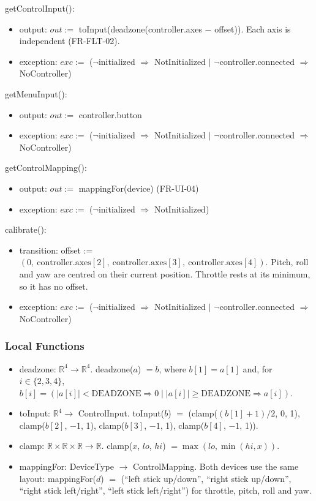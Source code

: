 \documentclass[12pt, titlepage]{article}
\newcommand{\noinit}{$\neg$initialized $\Rightarrow$ NotInitialized}
\begin{document}
\noindent getControlInput():
\begin{itemize}
\item output: $out :=$ toInput(deadzone(controller.axes $-$ offset)). Each
  axis is independent (FR-FLT-02).
\item exception: $exc :=$ (\noinit{} $|$ $\neg$controller.connected
  $\Rightarrow$ NoController)
\end{itemize}

\noindent getMenuInput():
\begin{itemize}
\item output: $out :=$ controller.button
\item exception: $exc :=$ (\noinit{} $|$ $\neg$controller.connected
  $\Rightarrow$ NoController)
\end{itemize}

\noindent getControlMapping():
\begin{itemize}
\item output: $out :=$ mappingFor(device) (FR-UI-04)
\item exception: $exc :=$ (\noinit)
\end{itemize}

\noindent calibrate():
\begin{itemize}
\item transition: offset := $(0,\ \text{controller.axes}[2],\
  \text{controller.axes}[3],\ \text{controller.axes}[4])$. Pitch, roll and yaw
  are centred on their current position. Throttle rests at its minimum, so it
  has no offset.
\item exception: $exc :=$ (\noinit{} $|$ $\neg$controller.connected
  $\Rightarrow$ NoController)
\end{itemize}

\subsubsection{Local Functions}

\begin{itemize}
\item deadzone: $\mathbb{R}^4 \rightarrow \mathbb{R}^4$. deadzone($a$) $= b$,
  where $b[1] = a[1]$ and, for $i \in \{2, 3, 4\}$, $b[i] = (|a[i]| <
  \text{DEADZONE} \Rightarrow 0 \;|\; |a[i]| \geq \text{DEADZONE} \Rightarrow
  a[i])$.
\item toInput: $\mathbb{R}^4 \rightarrow$ ControlInput. toInput($b$) $=$
  (clamp($(b[1] + 1)/2$, 0, 1), clamp($b[2]$, $-1$, 1), clamp($b[3]$, $-1$,
  1), clamp($b[4]$, $-1$, 1)).
\item clamp: $\mathbb{R} \times \mathbb{R} \times \mathbb{R} \rightarrow
  \mathbb{R}$. clamp($x$, $lo$, $hi$) $= \max(lo, \min(hi, x))$.
\item mappingFor: DeviceType $\rightarrow$ ControlMapping. Both devices use
  the same layout: mappingFor($d$) $=$ (``left stick up/down'', ``right stick
  up/down'', ``right stick left/right'', ``left stick left/right'') for
  throttle, pitch, roll and yaw.
\end{itemize}
\end{document}
